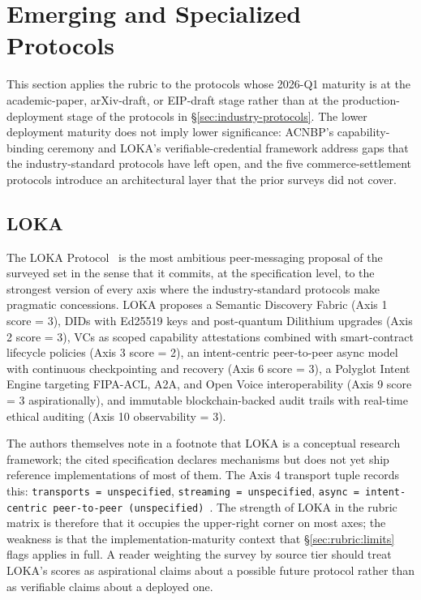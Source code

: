 \section{Emerging and Specialized Protocols}
\label{sec:emerging-protocols}

This section applies the rubric to the protocols whose
2026-Q1 maturity is at the academic-paper, arXiv-draft, or
EIP-draft stage rather than at the production-deployment
stage of the protocols in \S\ref{sec:industry-protocols}.
The lower deployment maturity does not imply lower
significance: ACNBP's capability-binding ceremony and LOKA's
verifiable-credential framework address gaps that the
industry-standard protocols have left open, and the five
commerce-settlement protocols introduce an architectural
layer that the prior surveys did not cover.

\subsection{LOKA}
\label{sec:emerging:loka}

The LOKA Protocol~\cite{spec_loka} is the most
ambitious peer-messaging proposal of the surveyed set in
the sense that it commits, at the specification level, to
the strongest version of every axis where the
industry-standard protocols make pragmatic concessions.
LOKA proposes a Semantic Discovery Fabric (Axis 1
score = 3), DIDs with Ed25519 keys and post-quantum
Dilithium upgrades (Axis 2 score = 3), VCs as scoped
capability attestations combined with smart-contract
lifecycle policies (Axis 3 score = 2), an
intent-centric peer-to-peer async model with continuous
checkpointing and recovery (Axis 6 score = 3), a Polyglot
Intent Engine targeting FIPA-ACL, A2A, and Open Voice
interoperability (Axis 9 score = 3 aspirationally), and
immutable blockchain-backed audit trails with real-time
ethical auditing (Axis 10 observability = 3).

The authors themselves note in a footnote that LOKA is a
conceptual research framework; the cited specification
declares mechanisms but does not yet ship reference
implementations of most of them. The Axis 4 transport
tuple records this: \texttt{transports = unspecified},
\texttt{streaming = unspecified}, \texttt{async =
intent-centric peer-to-peer (unspecified)}~\cite{spec_loka}.
The strength of LOKA in the rubric matrix is therefore
that it occupies the upper-right corner on most axes; the
weakness is that the implementation-maturity context that
\S\ref{sec:rubric:limits} flags applies in full. A
reader weighting the survey by source tier should treat
LOKA's scores as aspirational claims about a possible
future protocol rather than as verifiable claims about a
deployed one.

